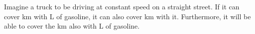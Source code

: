 



\begin{example}
  Imagine a truck to be driving at constant speed on a straight street.
  If it can cover \unit[100]{km} with \unit[10]{L} of gasoline, it can also cover \unit[80]{km} with it.
  Furthermore, it will be able to cover the \unit[100]{km} also with \unit[10]{L} of gasoline.
\end{example}
%

